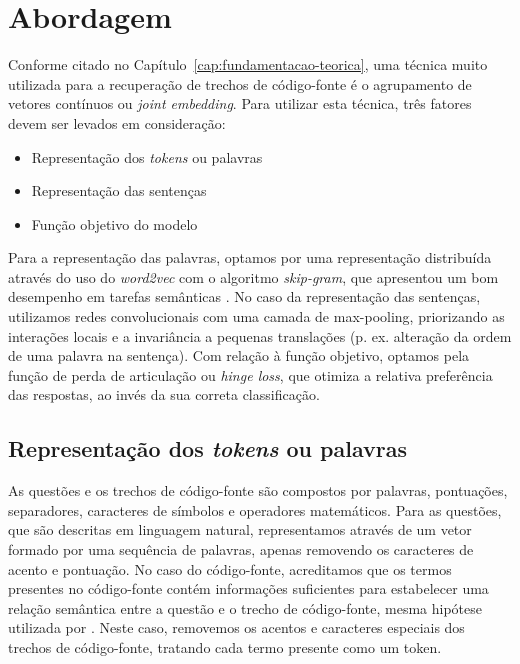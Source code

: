 \chapter{Abordagem}
\label{cap:abordagem}

Conforme citado no Capítulo~\ref{cap:fundamentacao-teorica}, uma técnica muito utilizada para a recuperação de trechos de código-fonte é o agrupamento de vetores contínuos ou \textit{joint embedding}. Para utilizar esta técnica, três fatores devem ser levados em consideração:

\begin{itemize}
    \item Representação dos \textit{tokens} ou palavras
    \item Representação das sentenças
    \item Função objetivo do modelo
\end{itemize}

Para a representação das palavras, optamos por uma representação distribuída através do uso do \textit{word2vec} com o algoritmo \textit{skip-gram}, que apresentou um bom desempenho em tarefas semânticas \cite{mikolov2013distributed}. No caso da representação das sentenças, utilizamos redes convolucionais com uma camada de \gls{max-pooling}, priorizando as interações locais e a invariância a pequenas translações (p. ex. alteração da ordem de uma palavra na sentença). Com relação à função objetivo, optamos pela função de perda de articulação ou \textit{hinge loss}, que otimiza a relativa preferência das respostas, ao invés da sua correta classificação.



\section{Representação dos \textit{tokens} ou palavras}
\label{sec:abordagem-representacao-token}

As questões e os trechos de código-fonte são compostos por palavras, pontuações, separadores, caracteres de símbolos e operadores matemáticos. Para as questões, que são descritas em linguagem natural, representamos através de um vetor formado por uma sequência de palavras, apenas removendo os caracteres de acento e pontuação. No caso do código-fonte, acreditamos que os termos presentes no código-fonte contém informações suficientes para estabelecer uma relação semântica entre a questão e o trecho de código-fonte, mesma hipótese utilizada por . Neste caso, removemos os acentos e caracteres especiais dos trechos de código-fonte, tratando cada termo presente como um \gls{token}.

